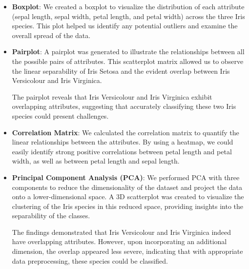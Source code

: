 \documentclass[conference]{inc/IEEEtran}
\begin{document}
\begin{itemize}
  \item \textbf{Boxplot}: We created a boxplot to visualize the distribution of each attribute (sepal length, sepal width,
  petal length, and petal width) across the three Iris species. This plot helped us identify any potential outliers
  and examine the overall spread of the data.
  \item \textbf{Pairplot}: A pairplot was generated to illustrate the relationships between all the possible pairs of attributes.
  This scatterplot matrix allowed us to observe the linear separability of Iris Setosa and the evident overlap between
  Iris Versicolour and Iris Virginica.

  The pairplot reveals that Iris Versicolour and Iris Virginica exhibit overlapping attributes, suggesting that accurately
  classifying these two Iris species could present challenges.

  \item \textbf{Correlation Matrix}: We calculated the correlation matrix to quantify the linear relationships between the attributes.
  By using a heatmap, we could easily identify strong positive correlations between petal length and petal width, as well as
  between petal length and sepal length.

  \item \textbf{Principal Component Analysis (PCA)}: We performed PCA with three components to reduce the dimensionality of the dataset
  and project the data onto a lower-dimensional space. A 3D scatterplot was created to visualize the clustering of the Iris
  species in this reduced space, providing insights into the separability of the classes.
  
  The findings demonstrated that Iris Versicolour and Iris Virginica indeed have overlapping attributes. However, upon
  incorporating an additional dimension, the overlap appeared less severe, indicating that with appropriate data preprocessing,
  these species could be classified.
\end{itemize}
\end{document}
